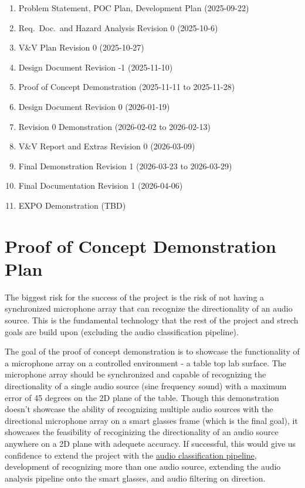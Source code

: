 \documentclass{article}
\begin{document}
\begin{enumerate}
  \item Problem Statement, POC Plan, Development Plan (2025-09-22)
  \item Req.\ Doc.\ and Hazard Analysis Revision 0 (2025-10-6)
  \item V\&V Plan Revision 0 (2025-10-27)
  \item Design Document Revision -1 (2025-11-10)
  \item Proof of Concept Demonstration (2025-11-11 to 2025-11-28)
  \item Design Document Revision 0 (2026-01-19)
  \item Revision 0 Demonstration (2026-02-02 to 2026-02-13)
  \item V\&V Report and Extras Revision 0 (2026-03-09)
  \item Final Demonstration Revision 1 (2026-03-23 to 2026-03-29)
  \item Final Documentation Revision 1 (2026-04-06)
  \item EXPO Demonstration (TBD)
\end{enumerate}

\section{Proof of Concept Demonstration Plan}


\hspace{1cm}

The biggest risk for the success of the project is the risk of not having a
synchronized microphone array that can recognize the directionality of an audio
source. This is the fundamental technology that the rest of the project and
strech goals are build upon (excluding the audio classification pipeline).

The goal of the proof of concept demonstration is to showcase the functionality
of a microphone array on a controlled environment - a table top lab surface. The
microphone array should be synchronized and capable of recognizing the
directionality of a single audio source (sine frequency sound) with a maximum
error of 45 degrees on the 2D plane of the table. Though this demonstration
doesn't showcase the ability of recognizing multiple audio sources with the
directional microphone array on a smart glasses frame (which is the final goal),
it showcases the feasibility of recoginizing the directionality of an audio
source anywhere on a 2D plane with adequete accuracy. If successful, this would
give us confidence to extend the project with the
\hyperlink{audio_classification_pipeline}{audio classification pipeline},
development of recognizing more than one audio source, extending the audio
analysis pipeline onto the smart glasses, and audio filtering on direction. 
\end{document}
